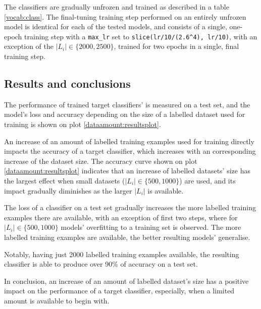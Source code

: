 The classifiers are gradually unfrozen and trained as described in a table \ref{vocab:class}. The final-tuning training step performed on an entirely unfrozen model is identical for each of the tested models, and consists of a single, one-epoch training step with a \lstinline{max_lr} set to \lstinline{slice(lr/10/(2.6^4), lr/10)}, with an exception of the $|L_i| \in \{2000, 2500\}$, trained for two epochs in a single, final training step.

\subsection{Results and conclusions}

The performance of trained target classifiers' is measured on a test set, and the model's loss and accuracy depending on the size of a labelled dataset used for training is shown on plot \ref{dataamount:resultsplot}.

An increase of an amount of labelled training examples used for training directly impacts the accuracy of a target classifier, which increases with an corresponding increase of the dataset size. The accuracy curve shown on plot \ref{dataamount:resultsplot} indicates that an increase of labelled datasets' size has the largest effect when small datasets ($|L_i| \in \{500, 1000\}$) are used, and its impact gradually diminishes as the larger $|L_i|$ is available.

The loss of a classifier on a test set gradually increases the more labelled training examples there are available, with an exception of first two steps, where for $|L_i| \in \{500, 1000\}$ models' overfitting to a training set is observed. The more labelled training examples are available, the better resulting models' generalise.

Notably, having just 2000 labelled training examples available, the resulting classifier is able to produce over 90\% of accuracy on a test set.

In conclusion, an increase of an amount of labelled dataset's size has a positive impact on the performance of a target classifier, especially, when a limited amount is available to begin with.

